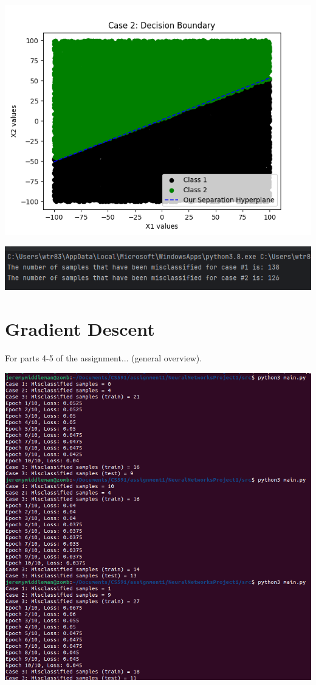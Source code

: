 \documentclass{article}
\begin{document}
\begin{center}
\includegraphics[scale=0.75]{../figs/P2.3.png}\\
\end{center}

\begin{center}
\includegraphics[scale=0.75]{../figs/P2.4.png}\\
\end{center}

\section{Gradient Descent}

For parts 4-5 of the assignment... (general overview).

\begin{center}
\includegraphics[scale=0.5]{../figs/P3.1.png}\\
\end{center}
\end{document}
